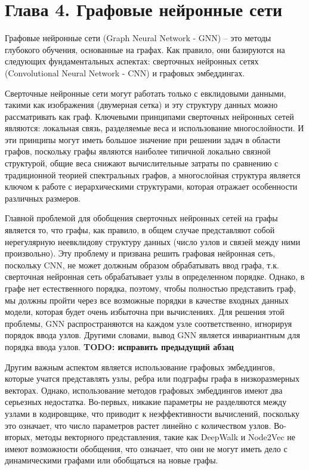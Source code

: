 \section{Глава 4. Графовые нейронные сети}
Графовые нейронные сети (Graph Neural Network - GNN) -- это методы глубокого обучения, основанные на графах. Как правило, они базируются на следующих фундаментальных аспектах: сверточных нейронных сетях (Convolutional Neural Network - CNN) и графовых эмбеддингах. 

Сверточные нейронные сети могут работать только с евклидовыми данными, такими как изображения (двумерная сетка) и эту структуру данных можно рассматривать как граф. Ключевыми принципами сверточных нейронных сетей являются: локальная связь, разделяемые веса и использование многослойности. И эти принципы могут иметь большое значение при решении задач в области графов, поскольку графы являются наиболее типичной локально связной структурой, общие веса снижают вычислительные затраты по сравнению с традиционной теорией спектральных графов, а многослойная структура является ключом к работе с иерархическими структурами, которая отражает особенности различных размеров. 

Главной проблемой для обобщения сверточных нейронных сетей на графы является то, что графы, как правило, в общем случае представляют собой нерегулярную неевклидову структуру данных (число узлов и связей между ними произвольно). Эту проблему и призвана решить графовая нейронная сеть, поскольку CNN, не может должным образом обрабатывать ввод графа, т.к. сверточная нейронная сеть обрабатывает  узлы в определенном порядке. Однако, в графе нет естественного порядка, поэтому, чтобы полностью представить граф, мы должны пройти через все возможные порядки в качестве входных данных модели, которая будет очень избыточна при вычислениях. Для решения этой проблемы, GNN распространяются на каждом узле соответственно, игнорируя порядок ввода узлов. Другими словами, вывод GNN является инвариантным для порядка ввода узлов. 
\textbf{TODO: исправить предыдущий абзац}

Другим важным аспектом является использование графовых эмбеддингов, которые учатся представлять узлы, ребра или подграфы графа в низкоразмерных векторах. Однако, использование методов графовых эмбеддингов имеют два серьезных недостатка. Во-первых, никакие параметры не разделяются между узлами в кодировщике, что приводит к неэффективности вычислений, поскольку это означает, что число параметров растет линейно с количеством узлов. Во-вторых, методы векторного представления, такие как DeepWalk и Node2Vec не имеют возможности обобщения, что означает, что они не могут иметь дело с динамическими графами или обобщаться на новые графы.

